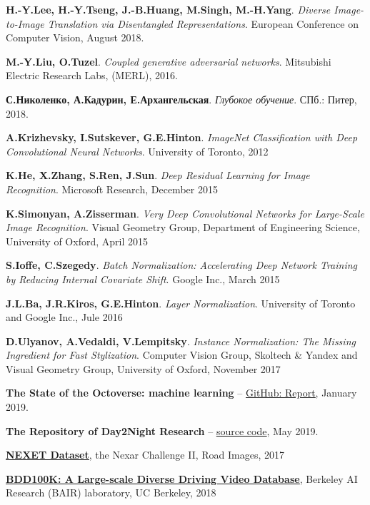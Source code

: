 \documentclass[11pt,a4paper]{extarticle}
\begin{document}
{\begin{thebibliography}{00}
	\textbf{H.-Y.Lee, H.-Y.Tseng, J.-B.Huang, M.Singh, M.-H.Yang}.
	\emph{Diverse Image-to-Image Translation via Disentangled Representations}.
	European Conference on Computer Vision,
	August 2018.

	\textbf{M.-Y.Liu, O.Tuzel}.
	\emph{Coupled generative adversarial networks}.
	Mitsubishi Electric Research Labs, (MERL),
	2016.

	\textbf{С.Николенко, А.Кадурин, Е.Архангельская}.
	\emph{Глубокое обучение}.
	СПб.: Питер, 
	2018.

	\textbf{A.Krizhevsky, I.Sutskever, G.E.Hinton}.
	\emph{ImageNet Classification with Deep Convolutional Neural Networks}.
	University of Toronto,
	2012

	\textbf{K.He, X.Zhang, S.Ren, J.Sun}.
	\emph{Deep Residual Learning for Image Recognition}.
	Microsoft Research,
	December 2015

	\textbf{K.Simonyan, A.Zisserman}.
	\emph{Very Deep Convolutional Networks for Large-Scale Image Recognition}.
	Visual Geometry Group, Department of Engineering Science, University of Oxford,
	April 2015

	\textbf{S.Ioffe, C.Szegedy}.
	\emph{Batch Normalization: Accelerating Deep Network Training by Reducing Internal Covariate Shift}.
	Google Inc.,
	March 2015

	\textbf{J.L.Ba, J.R.Kiros, G.E.Hinton}.
	\emph{Layer Normalization}.
	University of Toronto and Google Inc.,
	Jule 2016

	\textbf{D.Ulyanov, A.Vedaldi, V.Lempitsky}.
	\emph{Instance Normalization: The Missing Ingredient for Fast Stylization}.
	Computer Vision Group, Skoltech \& Yandex and Visual Geometry Group, University of Oxford,
	November 2017

	\textbf{The State of the Octoverse: machine learning} --
	\href{https://github.blog/2019-01-24-the-state-of-the-octoverse-machine-learning/}{\underline{GitHub: Report}},
	January 2019.

	\textbf{The Repository of Day2Night Research} --
	\href{https://github.com/solesensei/day2night}{\underline{source code}},
	May 2019.

	\href{https://www.getnexar.com/challenge-2/}{\textbf{\underline{NEXET Dataset}}},
	the Nexar Challenge II, Road Images,
	2017

	\href{https://bair.berkeley.edu/blog/2018/05/30/bdd/}{\underline{\textbf{BDD100K: A Large-scale Diverse Driving Video Database}}}, 
	Berkeley AI Research (BAIR) laboratory, UC Berkeley,
	2018


\end{thebibliography}}
\end{document}
